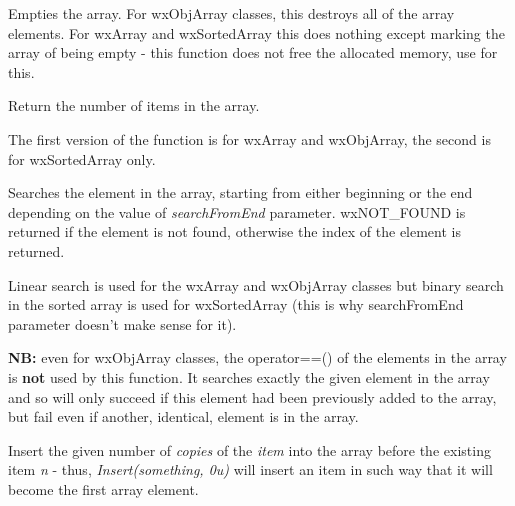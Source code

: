 
Empties the array. For wxObjArray classes, this destroys all of the array
elements. For wxArray and wxSortedArray this does nothing except marking the
array of being empty - this function does not free the allocated memory, use 
 for this.

\label{wxarraygetcount}


Return the number of items in the array.

\label{wxarrayindex}



The first version of the function is for wxArray and wxObjArray, the second is
for wxSortedArray only.

Searches the element in the array, starting from either beginning or the end
depending on the value of {\it searchFromEnd} parameter. wxNOT\_FOUND is
returned if the element is not found, otherwise the index of the element is
returned.

Linear search is used for the wxArray and wxObjArray classes but binary search
in the sorted array is used for wxSortedArray (this is why searchFromEnd
parameter doesn't make sense for it).

{\bf NB:} even for wxObjArray classes, the operator==() of the elements in the
array is {\bf not} used by this function. It searches exactly the given
element in the array and so will only succeed if this element had been
previously added to the array, but fail even if another, identical, element is
in the array.

\label{wxarrayinsert}




Insert the given number of {\it copies} of the {\it item} into the array before
the existing item {\it n} - thus, {\it Insert(something, 0u)} will insert an
item in such way that it will become the first array element.

